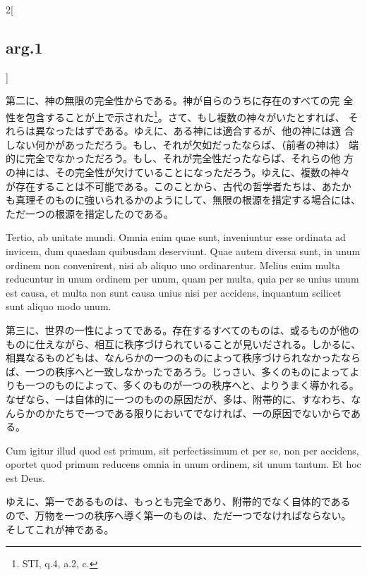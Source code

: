 \documentclass[paper=a4paper,fontsize=10pt,jafontsize=9pt,titlepage]{jlreq}
\begin{document}
\begin{paracol}{2}[\subsection{arg.1}]
\switchcolumn

第二に、神の無限の完全性からである。神が自らのうちに存在のすべての完
全性を包含することが上で示された\footnote{STI, q.4, a.2, c.}。さて、もし複数の神々がいたとすれば、
それらは異なったはずである。ゆえに、ある神には適合するが、他の神には適
合しない何かがあっただろう。もし、それが欠如だったならば、（前者の神は）
端的に完全でなかっただろう。もし、それが完全性だったならば、それらの他
方の神には、その完全性が欠けていることになっただろう。ゆえに、複数の神々
が存在することは不可能である。このことから、古代の哲学者たちは、あたか
も真理そのものに強いられるかのようにして、無限の根源を措定する場合には、
ただ一つの根源を措定したのである。

\switchcolumn*

Tertio, ab unitate mundi. Omnia enim quae sunt, inveniuntur esse
ordinata ad invicem, dum quaedam quibusdam deserviunt.  Quae autem
diversa sunt, in unum ordinem non convenirent, nisi ab aliquo uno
ordinarentur. Melius enim multa reducuntur in unum ordinem per unum,
quam per multa, quia per se unius unum est causa, et multa non sunt
causa unius nisi per accidens, inquantum scilicet sunt aliquo modo
unum.

\switchcolumn

第三に、世界の一性によってである。存在するすべてのものは、或るものが他の
ものに仕えながら、相互に秩序づけられていることが見いだされる。しかるに、
相異なるものどもは、なんらかの一つのものによって秩序づけられなかったなら
ば、一つの秩序へと一致しなかったであろう。じっさい、多くのものによってよ
りも一つのものによって、多くのものが一つの秩序へと、よりうまく導かれる。
なぜなら、一は自体的に一つのものの原因だが、多は、附帯的に、すなわち、な
んらかのかたちで一つである限りにおいてでなければ、一の原因でないからであ
る。

\switchcolumn*

Cum igitur illud quod est
primum, sit perfectissimum et per se, non per accidens, oportet quod
primum reducens omnia in unum ordinem, sit unum tantum. Et hoc est Deus.

\switchcolumn

ゆえに、第一であるものは、もっとも完全であり、附帯的でなく自体的である
ので、万物を一つの秩序へ導く第一のものは、ただ一つでなければならない。
そしてこれが神である。

\switchcolumn*[\subsection{ad.1}]


\end{paracol}
\end{document}

